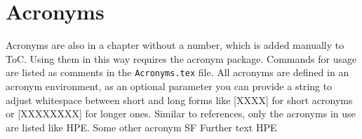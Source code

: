 \setcounter{page}{7} %


%
\section{Acronyms}
%
Acronyms are also in a chapter without a number, which is added manually to ToC. Using them in this way requires the acronym package. Commands for usage are listed as comments in the \texttt{Acronyms.tex} file. All acronyms are defined in an acronym environment, as an optional parameter you can provide a string to adjust whitespace between short and long forms like [XXXX] for short acronyms or [XXXXXXXX] for longer ones. Similar to references, only the acronyms in use are listed like 
\ac{HPE}.
Some other acronym \ac{SF}
Further text \ac{HPE}
%
